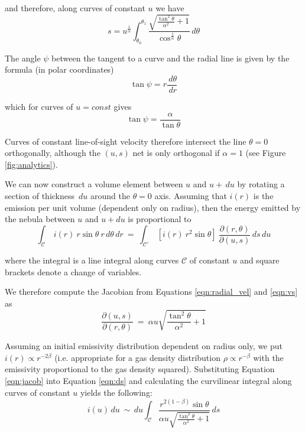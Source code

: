 \noindent and therefore, along curves of constant $u$ we have
 \begin{equation}
 \label{eqn:vs}
s = u^{\frac{1}{\alpha}} \int_{\theta_{0}}^{\theta_{1}} \frac{\sqrt{\frac{\tan^2\theta}{\alpha^2}+1}}{\cos ^ {\frac{1}{\alpha}}\theta}\, d\theta
\end{equation}


\noindent The angle $\psi$ between the tangent to a curve and the radial line  is given by the formula (in polar coordinates) \begin{equation}
\tan \psi = r \frac{\, d \theta}{\, d r} 
\end{equation}

\noindent which for curves of $u=const$ gives
\begin{equation}
\tan \psi = \frac{\alpha}{\tan \theta}
\end{equation}

Curves of constant line-of-sight velocity therefore intersect the line $\theta = 0$ orthogonally, although the $(u,s)$ net is only orthogonal if $\alpha=1$ (see Figure \ref{fig:analytics}).

We can now construct a volume element between $u$ and $u+\, du$ by rotating a section of thickness $\, du$  around the $\theta =0 $ axis.  Assuming that $i(r)$ is the emission per unit volume (dependent only on radius), then the energy emitted by the nebula between $u$ and $u+du$ is proportional to
\begin{equation}
\label{eqn:integral}
\int_{\mathcal{C}} \ i(r) \ r \sin \theta \ r \, d\theta \, dr  \ = \ \int_{\mathcal{C'}} \ [i(r) \ r^2 \sin \theta] \ \frac{\partial (r,\theta)}{\partial (u,s)}  \, ds \, du
\end{equation}

where the integral is a line integral along curves $\mathcal{C}$ of constant $u$ and square brackets denote a change of variables.  

We therefore compute the Jacobian from Equations \ref{eqn:radial_vel} and \ref{eqn:vs} as
\begin{equation}
\label{eqn:jacob}
\frac{\partial (u,s)}{\partial (r,\theta)} \ = \ \alpha  u \sqrt{\frac{\tan^2\theta}{\alpha^2}+1}
\end{equation}

Assuming an initial emissivity distribution dependent on radius only, we put $i(r) \propto r^{-2\beta}$ (i.e. appropriate for a gas density distribution $\rho \propto r^{-\beta}$ with the emissivity proportional to the gas density squared).  Substituting Equation \ref{eqn:jacob} into Equation \ref{eqn:ds} and calculating the curvilinear integral along curves of constant $u$ yields the following:
\begin{equation}
i(u) \,d u \ \sim \, du \int_\mathcal{C} \frac{r^{2(1-\beta)}\sin \theta}{\alpha u \sqrt{\frac{\tan^2\theta}{\alpha^2}+1}} \, ds 
\end{equation}

